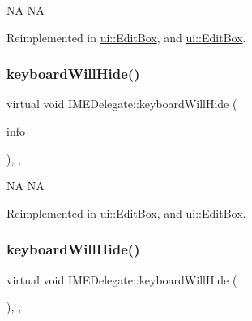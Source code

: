NA  NA 

Reimplemented in \hyperlink{classui_1_1EditBox_ad5095cb70eebd06257e074c7b043ea89}{ui\+::\+Edit\+Box}, and \hyperlink{classui_1_1EditBox_a88c3e0a04a3857cacfc6cab7850fb8e0}{ui\+::\+Edit\+Box}.

\mbox{\label{classIMEDelegate_a576cd6b268dfab44836f74183cb76f06}} 
\subsubsection{\texorpdfstring{keyboard\+Will\+Hide()}{keyboardWillHide()}\hspace{0.1cm}{\footnotesize\ttfamily [1/2]}}
{\footnotesize\ttfamily virtual void I\+M\+E\+Delegate\+::keyboard\+Will\+Hide (\begin{DoxyParamCaption}\item[{\hyperlink{structIMEKeyboardNotificationInfo}{I\+M\+E\+Keyboard\+Notification\+Info} \&}]{info }\end{DoxyParamCaption})\hspace{0.3cm}{\ttfamily [inline]}, {\ttfamily [protected]}, {\ttfamily [virtual]}}

NA  NA 

Reimplemented in \hyperlink{classui_1_1EditBox_aabf158a71e53e27677d85b86e9aa4e3a}{ui\+::\+Edit\+Box}, and \hyperlink{classui_1_1EditBox_afa54a7e9d06de4524963bf23565e8310}{ui\+::\+Edit\+Box}.

\mbox{\label{classIMEDelegate_ab5c220c67ac7617ae9e9d2d14e6b34b3}} 
\subsubsection{\texorpdfstring{keyboard\+Will\+Hide()}{keyboardWillHide()}\hspace{0.1cm}{\footnotesize\ttfamily [2/2]}}
{\footnotesize\ttfamily virtual void I\+M\+E\+Delegate\+::keyboard\+Will\+Hide (\begin{DoxyParamCaption}\item[{\hyperlink{structIMEKeyboardNotificationInfo}{I\+M\+E\+Keyboard\+Notification\+Info} \&}]{ }\end{DoxyParamCaption})\hspace{0.3cm}{\ttfamily [inline]}, {\ttfamily [protected]}, {\ttfamily [virtual]}}

